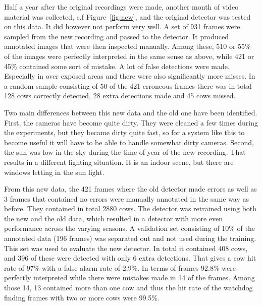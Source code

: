 \documentclass{cta-author}
\begin{document}
Half a year after the original recordings were made, another month of video material was collected, c.f
Figure~\ref{fig:new}, and the original detector was tested on this data. It did however not perform very
well. A set of 931 frames were sampled from the new recording and passed to the detector. It produced
annotated images that were then inspected manually. Among these, 510 or 55\% of the images were perfectly
interpreted in the same sense as above, while 421 or 45\% contained some sort of mistake.
A lot of false detections were made. Especially in over exposed areas and there were also significantly
more misses. In a random sample consisting of 50 of the 421 erroneous frames there was in total 128 cows correctly detected, 28 extra detections made and 45 cows missed.

Two main differences between this new data and the old one have been identified.
First, the cameras have become quite dirty. They were cleaned a few times during the experiments, but they
became dirty quite fast, so for a system like this to become useful it will have to be able to handle
somewhat dirty cameras. Second, the sun was low in the sky during  the time of year of the new recording.
That results in a different lighting situation. It is an indoor scene, but there are windows letting in the
sun light.

From this new data, the 421 frames where the old detector made errors as well as 3 frames that contained no
errors were manually annotated in the same way as before. They contained in total 2880 cows. The detector was
retrained using both the new and the old data, which resulted in a detector with more even performance across
the varying seasons. A validation set consisting of 10\% of the annotated data (196 frames) was separated
out and not used during the training. This set was used to evaluate the new detector. In total it contained
408 cows, and 396 of these were detected with only 6 extra detections. That gives a cow hit rate of 97\%
with a false alarm rate of 2.9\%. In terms of frames 92.8\% were perfectly interpreted while there were
mistakes made in 14 of the frames. Among those 14, 13 contained more than one cow and thus the hit rate of
the watchdog finding frames with two or more cows were 99.5\%.
\end{document}
